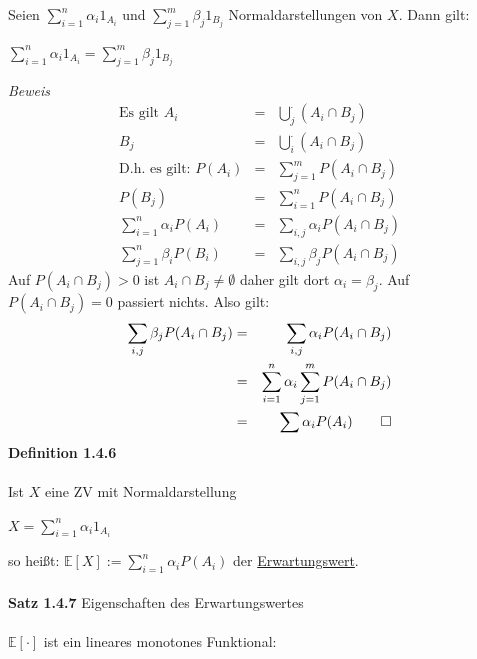 \documentclass[10pt,a4paper]{report}
\numberwithin{equation}{section}
\numberwithin{figure}{section}
\theoremstyle{plain}
\theoremstyle{definition}
\theoremstyle{plain}
\theoremstyle{definition}
\theoremstyle{remark}
\theoremstyle{plain}
\theoremstyle{plain}
\theoremstyle{plain}
\newcommand{\1}{ \mathbb{1} } %
\begin{document}
Seien $\sum\limits_{i=1}^n \alpha_i 1_{A_i}$ und $\sum\limits_{j=1}^m\beta_j1_{B_j}$ Normaldarstellungen von $X$. Dann gilt:
\begin{center}
$\sum\limits_{i=1}^n \alpha_i 1_{A_i}=\sum\limits_{j=1}^m\beta_j1_{B_j}$
\end{center}
\textit{Beweis}
\begin{eqnarray*}
\text{Es gilt } A_i&=&\bigcup_j^\cdot (A_i\cap B_j)\\
B_j&=&\bigcup_i^\cdot (A_i\cap B_j)\\
\text{D.h. es gilt: } P(A_i)&=&\sum\limits_{j=1}^mP(A_i\cap B_j)\\
P(B_j)&=&\sum\limits_{i=1}^nP(A_i\cap B_j)\\
\sum\limits_{i=1}^n\alpha_iP(A_i)&=&\sum\limits_{i,j}\alpha_iP(A_i\cap B_j)\\
\sum\limits_{j=1}^n\beta_iP(B_i)&=&\sum\limits_{i,j}\beta_jP(A_i\cap B_j)
\end{eqnarray*}
Auf $P(A_i\cap B_j)>0$ ist $A_i\cap B_j \neq \emptyset$ daher gilt dort $\alpha_i=\beta_j$. Auf $P(A_i\cap B_j)=0$ passiert nichts. Also gilt:
\begin{eqnarray*}
\sum\limits_{i,j}\beta_jP(A_i\cap B_j)&=&\sum\limits_{i,j}\alpha_iP(A_i\cap B_j)\\
&=&\sum\limits_{i=1}^n\alpha_i\sum\limits_{j=1}^mP(A_i\cap B_j)\\
&=&\sum\limits \alpha_i P(A_i)\qed
\end{eqnarray*}
\textbf{Definition 1.4.6}\\\\
Ist $X$ eine ZV mit Normaldarstellung
\begin{center}
$X=\sum\limits_{i=1}^n\alpha_i1_{A_i}$
\end{center}
so heißt: $\mathbb{E}[X]:=\sum\limits_{i=1}^n\alpha_iP(A_i)$ der \underline{Erwartungswert}.\\\\
\textbf{Satz 1.4.7} Eigenschaften des Erwartungswertes\\\\
$\mathbb{E}[\cdot]$ ist ein lineares monotones Funktional:\\\\
\end{document}
